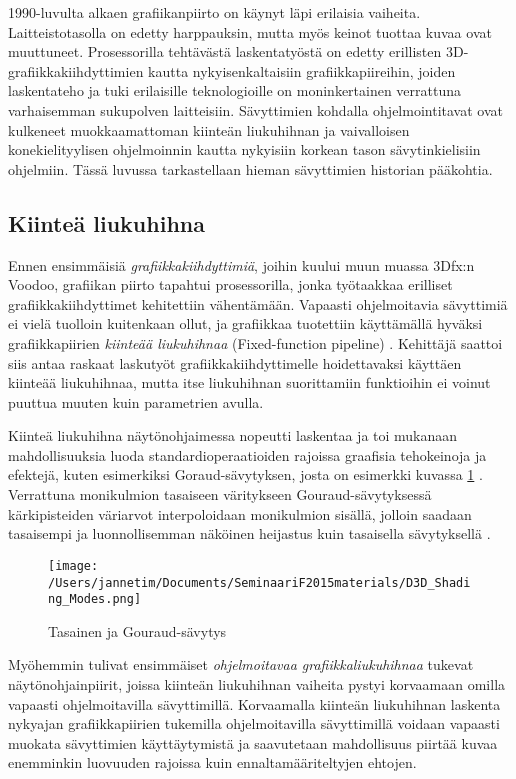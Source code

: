 \documentclass[finnish]{tktltiki2}
\theoremstyle{definition}
\theoremstyle{remark}
\begin{document}
1990-luvulta alkaen grafiikanpiirto on käynyt läpi erilaisia vaiheita. Laitteistotasolla on edetty harppauksin, mutta myös keinot tuottaa kuvaa ovat muuttuneet. Prosessorilla tehtävästä laskentatyöstä on edetty erillisten 3D-grafiikkakiihdyttimien kautta nykyisenkaltaisiin grafiikkapiireihin, joiden laskentateho ja tuki erilaisille teknologioille on moninkertainen verrattuna varhaisemman sukupolven laitteisiin. Sävyttimien kohdalla ohjelmointitavat ovat kulkeneet muokkaamattoman kiinteän liukuhihnan ja vaivalloisen konekielityylisen ohjelmoinnin kautta nykyisiin korkean tason sävytinkielisiin ohjelmiin. Tässä luvussa tarkastellaan hieman sävyttimien historian pääkohtia.

\subsection{Kiinteä liukuhihna}

Ennen ensimmäisiä \emph{grafiikkakiihdyttimiä}, joihin kuului muun muassa 3Dfx:n Voodoo, grafiikan piirto tapahtui prosessorilla, jonka työtaakkaa erilliset grafiikkakiihdyttimet kehitettiin vähentämään. Vapaasti ohjelmoitavia sävyttimiä ei vielä tuolloin kuitenkaan ollut, ja grafiikkaa tuotettiin käyttämällä hyväksi grafiikkapiirien \emph{kiinteää liukuhihnaa} (Fixed-function pipeline) \cite[s. 11]{She08}. Kehittäjä saattoi siis antaa raskaat laskutyöt grafiikkakiihdyttimelle hoidettavaksi käyttäen kiinteää liukuhihnaa, mutta itse liukuhihnan suorittamiin funktioihin ei voinut puuttua muuten kuin parametrien avulla. 

Kiinteä liukuhihna näytönohjaimessa nopeutti laskentaa ja toi mukanaan mahdollisuuksia luoda standardioperaatioiden rajoissa graafisia tehokeinoja ja efektejä, kuten esimerkiksi Goraud-sävytyksen, josta on esimerkki kuvassa \ref{FGP} \cite{Bur09}. Verrattuna monikulmion tasaiseen väritykseen Gouraud-sävytyksessä kärkipisteiden väriarvot interpoloidaan monikulmion sisällä, jolloin saadaan tasaisempi ja luonnollisemman näköinen heijastus kuin tasaisella sävytyksellä \cite{Gou71}.

\begin{figure}[!htpb]
\texttt{[image: /Users/jannetim/Documents/SeminaariF2015materials/D3D\_Shading\_Modes.png]}
\caption{Tasainen ja Gouraud-sävytys}
\label{FGP}
\end{figure}

Myöhemmin tulivat ensimmäiset \emph{ohjelmoitavaa grafiikkaliukuhihnaa} tukevat näytönohjainpiirit, joissa kiinteän liukuhihnan vaiheita pystyi korvaamaan omilla vapaasti ohjelmoitavilla sävyttimillä. Korvaamalla kiinteän liukuhihnan laskenta nykyajan grafiikkapiirien tukemilla ohjelmoitavilla sävyttimillä voidaan vapaasti muokata sävyttimien käyttäytymistä ja saavutetaan mahdollisuus piirtää kuvaa enemminkin luovuuden rajoissa kuin ennaltamääriteltyjen ehtojen. 
\end{document}
